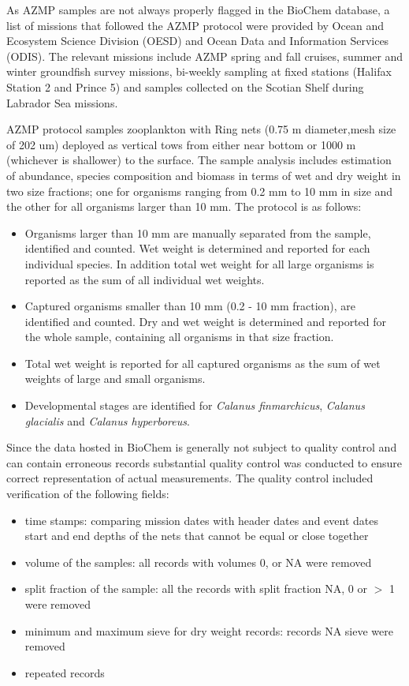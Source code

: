 \documentclass[letterpaper,portrait,11pt]{scrartcl}
\numberwithin{equation}{section}		%
\numberwithin{figure}{section}			%
\numberwithin{table}{section}				%
\begin{document}
\begin{appendices}
As AZMP samples are not always properly flagged in the BioChem database, a list of missions that followed the AZMP protocol were provided by Ocean and Ecosystem Science Division (OESD) and Ocean Data and Information Services (ODIS). The relevant missions include AZMP spring and fall cruises, summer and winter groundfish survey missions, bi-weekly sampling at fixed stations (Halifax Station 2 and Prince 5) and samples collected on the Scotian Shelf during Labrador Sea missions. 

AZMP protocol samples zooplankton with Ring nets (0.75 m diameter,mesh size of 202 um) deployed as vertical tows from either near bottom or 1000 m (whichever is shallower) to the surface. The sample analysis includes estimation of abundance, species composition and biomass in terms of wet and dry weight in two size fractions; one for organisms ranging from 0.2 mm to 10 mm in size and the other for all organisms larger than 10 mm.  The protocol is as follows:

\begin{itemize}
  \item Organisms larger than 10 mm are manually separated from the sample, identified and counted. Wet weight is determined and reported for each individual species. In addition total wet weight for all large organisms is reported as the sum of all individual wet weights.
  \item Captured organisms smaller than 10 mm (0.2 - 10 mm fraction), are identified and counted. Dry and wet weight is determined and reported for the whole sample, containing all organisms in that size fraction.
  \item Total wet weight is reported for all captured organisms as the sum of wet weights of large and small organisms.
  \item Developmental stages are identified for \textit{Calanus finmarchicus}, \textit{Calanus glacialis} and \textit{Calanus hyperboreus}. 
\end{itemize}


Since the data hosted in BioChem is generally not subject to quality control and can contain erroneous records substantial quality control was conducted to ensure correct representation of actual measurements. The quality control included verification of the following fields: 

\begin{itemize}
  \item time stamps: comparing mission dates with header dates and event dates 
  start and end depths of the nets that cannot be equal or close together
  \item volume of the samples: all records with volumes 0, or NA were removed
  \item split fraction of the sample: all the records with split fraction NA, 0 or $>$ 1 were removed 
  \item minimum and maximum sieve for dry weight records: records NA sieve were removed
  \item repeated records 
\end{itemize}



\end{appendices}
\end{document}
